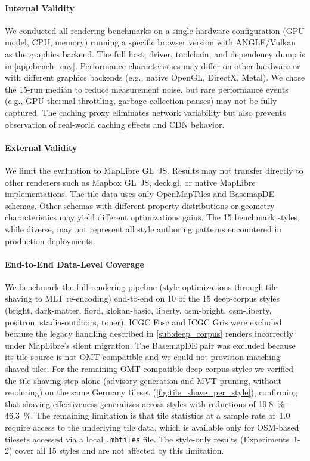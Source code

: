 \paragraph{Internal Validity}
We conducted all rendering benchmarks on a single hardware configuration (\ac{GPU} model, \ac{CPU}, memory) running a specific browser version with ANGLE/Vulkan as the graphics backend.
The full host, driver, toolchain, and dependency dump is in \cref{app:bench_env}.
Performance characteristics may differ on other hardware or with different graphics backends (e.g., native OpenGL, DirectX, Metal).
We chose the 15-run median to reduce measurement noise, but rare performance events (e.g., \ac{GPU} thermal throttling, garbage collection pauses) may not be fully captured.
The caching proxy eliminates network variability but also prevents observation of real-world caching effects and \ac{CDN} behavior.

\paragraph{External Validity}
We limit the evaluation to MapLibre GL~JS.
Results may not transfer directly to other renderers such as Mapbox GL~JS, deck.gl, or native MapLibre implementations.
The tile data uses only OpenMapTiles and BasemapDE schemas.
Other schemas with different property distributions or geometry characteristics may yield different optimizations gains.
The 15 benchmark styles, while diverse, may not represent all style authoring patterns encountered in production deployments.

\paragraph{End-to-End Data-Level Coverage}
We benchmark the full rendering pipeline (style optimizations through tile shaving to \ac{MLT} re-encoding) end-to-end on 10 of the 15 deep-corpus styles (bright, dark-matter, fiord, klokan-basic, liberty, osm-bright, osm-liberty, positron, stadia-outdoors, toner).
ICGC Fosc and ICGC Gris were excluded because the legacy  handling described in \cref{sub:deep_corpus} renders incorrectly under MapLibre's silent migration.
The BasemapDE pair was excluded because its tile source is not \ac{OMT}-compatible and we could not provision matching shaved tiles.
For the remaining \ac{OMT}-compatible deep-corpus styles we verified the tile-shaving step alone (advisory generation and \ac{MVT} pruning, without rendering) on the same Germany tileset (\cref{fig:tile_shave_per_style}), confirming that shaving effectiveness generalizes across styles with reductions of \qtyrange{19.8}{46.3}{\percent}.
The remaining limitation is that tile statistics at a sample rate of~1.0 require access to the underlying tile data, which is available only for \ac{OSM}-based tilesets accessed via a local \texttt{.mbtiles} file.
The style-only results (Experiments~1-2) cover all 15 styles and are not affected by this limitation.


